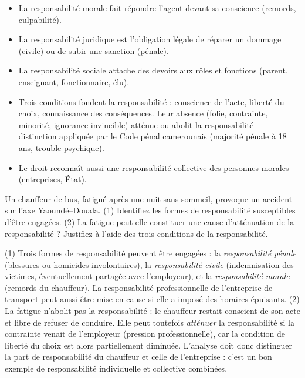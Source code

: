 \documentclass[11pt]{article}
\begin{document}
\begin{aretenir}
\begin{itemize}
\item La responsabilité morale fait répondre l'agent devant sa conscience (remords, culpabilité).
\item La responsabilité juridique est l'obligation légale de réparer un dommage (civile) ou de subir une sanction (pénale).
\item La responsabilité sociale attache des devoirs aux rôles et fonctions (parent, enseignant, fonctionnaire, élu).
\item Trois conditions fondent la responsabilité : conscience de l'acte, liberté du choix, connaissance des conséquences. Leur absence (folie, contrainte, minorité, ignorance invincible) atténue ou abolit la responsabilité — distinction appliquée par le Code pénal camerounais (majorité pénale à 18 ans, trouble psychique).
\item Le droit reconnaît aussi une responsabilité collective des personnes morales (entreprises, État).
\end{itemize}
\end{aretenir}

\begin{exercice}
Un chauffeur de bus, fatigué après une nuit sans sommeil, provoque un accident sur l'axe Yaoundé--Douala. (1) Identifiez les formes de responsabilité susceptibles d'être engagées. (2) La fatigue peut-elle constituer une cause d'atténuation de la responsabilité ? Justifiez à l'aide des trois conditions de la responsabilité.
\end{exercice}

\begin{corrige}[Exercice 1]
(1) Trois formes de responsabilité peuvent être engagées : la \emph{responsabilité pénale} (blessures ou homicides involontaires), la \emph{responsabilité civile} (indemnisation des victimes, éventuellement partagée avec l'employeur), et la \emph{responsabilité morale} (remords du chauffeur). La responsabilité professionnelle de l'entreprise de transport peut aussi être mise en cause si elle a imposé des horaires épuisants.
(2) La fatigue n'abolit pas la responsabilité : le chauffeur restait conscient de son acte et libre de refuser de conduire. Elle peut toutefois \emph{atténuer} la responsabilité si la contrainte venait de l'employeur (pression professionnelle), car la condition de liberté du choix est alors partiellement diminuée. L'analyse doit donc distinguer la part de responsabilité du chauffeur et celle de l'entreprise : c'est un bon exemple de responsabilité individuelle et collective combinées.
\end{corrige}
\end{document}
